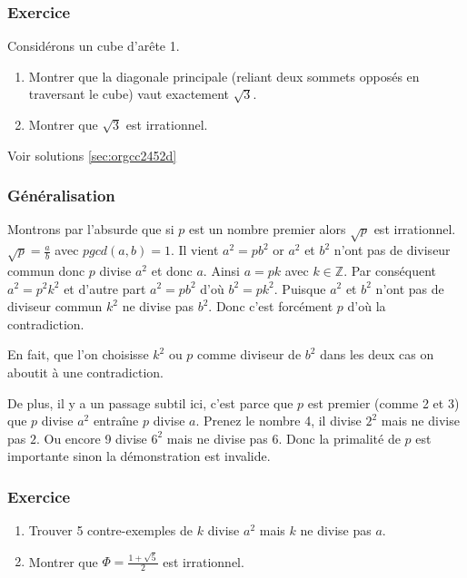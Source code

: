\documentclass[a4paper, 11pt, twoside]{article}
\newcommand{\E}[1]{\mathbb{#1}}
\begin{document}
\subsubsection{Exercice}
\label{sec:org1191128}
Considérons un cube d'arête 1.
\begin{enumerate}
\item Montrer que la diagonale principale (reliant deux sommets
opposés en traversant le cube) vaut exactement \(\sqrt{3}\).
\item Montrer que \(\sqrt{3}\) est irrationnel.
\end{enumerate}


Voir solutions \ref{sec:orgcc2452d}

\subsubsection{Généralisation}
\label{sec:orgf5012d4}

Montrons par l'absurde que si \(p\) est un nombre premier alors
\(\sqrt{p}\) est irrationnel. \(\sqrt{p} = \frac{a}{b}\) avec \(pgcd(a,
    b) = 1\). Il vient \(a^2 = pb^2\) or \(a^2\) et \(b^2\) n'ont pas de
diviseur commun donc \(p\) divise \(a^2\) et donc \(a\). Ainsi \(a = pk\)
avec \(k\in\E{Z}\). Par conséquent \(a^2 = p^2k^2\) et d'autre
part \(a^2 = pb^2\) d'où \(b^2 = pk^2\). Puisque \(a^2\) et \(b^2\) n'ont
pas de diviseur commun \(k^2\) ne divise pas \(b^2\). Donc c'est
forcément \(p\) d'où la contradiction.

En fait, que l'on choisisse \(k^2\) ou \(p\) comme diviseur de \(b^2\)
dans les deux cas on aboutit à une contradiction.

De plus, il y a un passage subtil ici, c'est parce que \(p\) est
premier (comme 2 et 3) que \(p\) divise \(a^2\) entraîne \(p\) divise
\(a\). Prenez le nombre 4, il divise \(2^2\) mais ne divise pas
\(2\). Ou encore 9 divise \(6^2\) mais ne divise pas 6. Donc la
primalité de \(p\) est importante sinon la démonstration est
invalide.

\subsubsection{Exercice}
\label{sec:org0527421}
\begin{enumerate}
\item Trouver 5 contre-exemples de \(k\) divise \(a^2\) mais \(k\) ne
divise pas \(a\).
\item Montrer que \(\Phi = \frac{1 + \sqrt{5}}{2}\) est irrationnel.
\end{enumerate}
\end{document}

